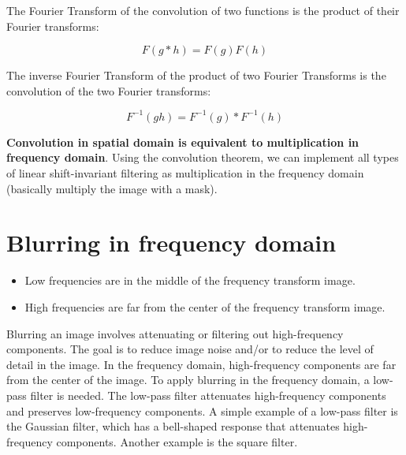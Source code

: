 \documentclass{article}
\begin{document}
The Fourier Transform of the convolution of two functions is the product of their Fourier transforms:

\begin{equation*}
    F(g * h) = F(g)F(h)
\end{equation*}

The inverse Fourier Transform of the product of two Fourier Transforms is the convolution of the two Fourier transforms:

\begin{equation*}
    F^{-1}(gh) = F^{-1}(g) * F^{-1}(h)
\end{equation*}

\textbf{Convolution in spatial domain is equivalent to multiplication in frequency domain}. Using the convolution theorem, we can implement all types of linear shift-invariant filtering as multiplication in the frequency domain (basically multiply the image with a mask).

\section*{Blurring in frequency domain}

\begin{itemize}
    \item Low frequencies are in the middle of the frequency transform image.
    \item High frequencies are far from the center of the frequency transform image. 
\end{itemize}

Blurring an image involves attenuating or filtering out high-frequency components. The goal is to reduce image noise and/or to reduce the level of detail in the image. In the frequency domain, high-frequency components are far from the center of the image. To apply blurring in the frequency domain, a low-pass filter is needed. The low-pass filter attenuates high-frequency components and preserves low-frequency components. A simple example of a low-pass filter is the Gaussian filter, which has a bell-shaped response that attenuates high-frequency components. Another example is the square filter.
\end{document}
